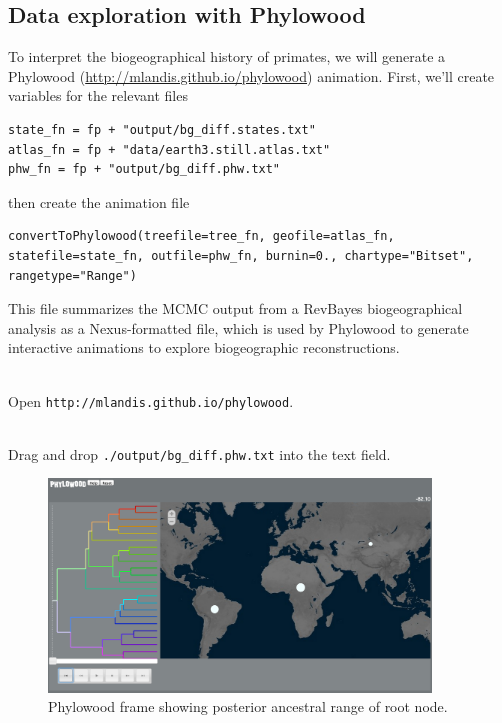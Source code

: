 \subsection{Data exploration with Phylowood}

To interpret the biogeographical history of primates, we will generate a Phylowood (\url{http://mlandis.github.io/phylowood}) animation.
First, we'll create variables for the relevant files

\begin{snugshade}
\begin{lstlisting}
state_fn = fp + "output/bg_diff.states.txt"
atlas_fn = fp + "data/earth3.still.atlas.txt"
phw_fn = fp + "output/bg_diff.phw.txt"
\end{lstlisting}
\end{snugshade}

then create the animation file

\begin{snugshade}
\begin{lstlisting}
convertToPhylowood(treefile=tree_fn, geofile=atlas_fn, statefile=state_fn, outfile=phw_fn, burnin=0., chartype="Bitset", rangetype="Range")
\end{lstlisting}
\end{snugshade}

This file summarizes the MCMC output from a RevBayes biogeographical analysis as a Nexus-formatted file, which is used by Phylowood to generate interactive animations to explore biogeographic reconstructions.

\noindent \\ \impmark Open \texttt{http://mlandis.github.io/phylowood}.

\noindent \\ \impmark Drag and drop \texttt{./output/bg\_diff.phw.txt} into the text field.

\begin{figure}[H]
\centering
\includegraphics[width=4in]{figures/bg_1_mrca}
\caption{Phylowood frame showing posterior ancestral range of root node.}
\end{figure}

